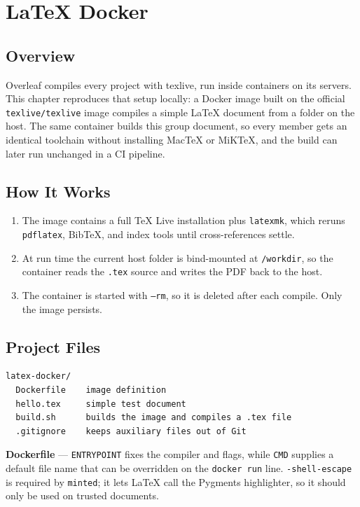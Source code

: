 \chapter{LaTeX Docker}

\section{Overview}
Overleaf compiles every project with \gls{texlive}, run inside containers on
its servers. This chapter reproduces that setup locally: a Docker image built on
the official \texttt{texlive/texlive} image compiles a simple LaTeX document
from a folder on the host. The same container builds this group document, so
every member gets an identical toolchain without installing MacTeX or MiKTeX,
and the build can later run unchanged in a CI pipeline.

\section{How It Works}
\begin{enumerate}
\item The image contains a full TeX Live installation plus \texttt{latexmk},
which reruns \texttt{pdflatex}, BibTeX, and index tools until cross-references
settle.
\item At run time the current host folder is bind-mounted at
\texttt{/workdir}, so the container reads the \texttt{.tex} source and writes
the PDF back to the host.
\item The container is started with \texttt{--rm}, so it is deleted after each
compile. Only the image persists.
\end{enumerate}

\section{Project Files}
\begin{verbatim}
latex-docker/
  Dockerfile    image definition
  hello.tex     simple test document
  build.sh      builds the image and compiles a .tex file
  .gitignore    keeps auxiliary files out of Git
\end{verbatim}

\noindent\textbf{Dockerfile} --- \texttt{ENTRYPOINT} fixes the compiler and
flags, while \texttt{CMD} supplies a default file name that can be overridden on
the \texttt{docker run} line. \texttt{-shell-escape} is required by
\texttt{minted}; it lets LaTeX call the Pygments highlighter, so it should only
be used on trusted documents.
\inputminted{docker}{../latex-docker/Dockerfile}

